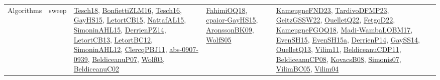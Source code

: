 {\begin{longtable}{lp{3cm}>{\raggedright}p{6cm}>{\raggedright}p{6cm}p{8cm}}
Algorithms & sweep & \href{papers/Tesch18.pdf}{Tesch18}\cite{Tesch18}, \href{papers/BonfiettiZLM16.pdf}{BonfiettiZLM16}\cite{BonfiettiZLM16}, \href{papers/Tesch16.pdf}{Tesch16}\cite{Tesch16}, \href{papers/GayHS15.pdf}{GayHS15}\cite{GayHS15}, \href{articles/LetortCB15.pdf}{LetortCB15}\cite{LetortCB15}, \href{articles/NattafAL15.pdf}{NattafAL15}\cite{NattafAL15}, \href{articles/SimoninAHL15.pdf}{SimoninAHL15}\cite{SimoninAHL15}, \href{papers/DerrienPZ14.pdf}{DerrienPZ14}\cite{DerrienPZ14}, \href{papers/LetortCB13.pdf}{LetortCB13}\cite{LetortCB13}, \href{papers/LetortBC12.pdf}{LetortBC12}\cite{LetortBC12}, \href{papers/SimoninAHL12.pdf}{SimoninAHL12}\cite{SimoninAHL12}, \href{papers/ClercqPBJ11.pdf}{ClercqPBJ11}\cite{ClercqPBJ11}, \href{articles/abs-0907-0939.pdf}{abs-0907-0939}\cite{abs-0907-0939}, \href{papers/BeldiceanuP07.pdf}{BeldiceanuP07}\cite{BeldiceanuP07}, \href{papers/Wolf03.pdf}{Wolf03}\cite{Wolf03}, \href{papers/BeldiceanuC02.pdf}{BeldiceanuC02}\cite{BeldiceanuC02} & \href{articles/FahimiOQ18.pdf}{FahimiOQ18}\cite{FahimiOQ18}, \href{papers/cpaior-GayHS15.pdf}{cpaior-GayHS15}\cite{cpaior-GayHS15}, \href{papers/AronssonBK09.pdf}{AronssonBK09}\cite{AronssonBK09}, \href{papers/WolfS05.pdf}{WolfS05}\cite{WolfS05} & \href{papers/KameugneFND23.pdf}{KameugneFND23}\cite{KameugneFND23}, \href{papers/TardivoDFMP23.pdf}{TardivoDFMP23}\cite{TardivoDFMP23}, \href{papers/GeitzGSSW22.pdf}{GeitzGSSW22}\cite{GeitzGSSW22}, \href{papers/OuelletQ22.pdf}{OuelletQ22}\cite{OuelletQ22}, \href{articles/FetgoD22.pdf}{FetgoD22}\cite{FetgoD22}, \href{papers/KameugneFGOQ18.pdf}{KameugneFGOQ18}\cite{KameugneFGOQ18}, \href{papers/Madi-WambaLOBM17.pdf}{Madi-WambaLOBM17}\cite{Madi-WambaLOBM17}, \href{papers/EvenSH15.pdf}{EvenSH15}\cite{EvenSH15}, \href{articles/EvenSH15a.pdf}{EvenSH15a}\cite{EvenSH15a}, \href{papers/DerrienP14.pdf}{DerrienP14}\cite{DerrienP14}, \href{papers/GaySS14.pdf}{GaySS14}\cite{GaySS14}, \href{papers/OuelletQ13.pdf}{OuelletQ13}\cite{OuelletQ13}, \href{papers/Vilim11.pdf}{Vilim11}\cite{Vilim11}, \href{articles/BeldiceanuCDP11.pdf}{BeldiceanuCDP11}\cite{BeldiceanuCDP11}, \href{papers/BeldiceanuCP08.pdf}{BeldiceanuCP08}\cite{BeldiceanuCP08}, \href{articles/KovacsB08.pdf}{KovacsB08}\cite{KovacsB08}, \href{articles/Simonis07.pdf}{Simonis07}\cite{Simonis07}, \href{articles/VilimBC05.pdf}{VilimBC05}\cite{VilimBC05}, \href{papers/Vilim04.pdf}{Vilim04}\cite{Vilim04}\\

\end{longtable}}
